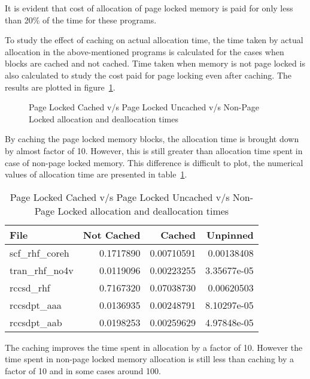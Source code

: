 It is evident that cost of allocation of page locked memory is
paid for only less than 20\% of the time for these programs.

To study the effect of caching on actual allocation time, the time taken by actual
allocation in the above-mentioned programs is calculated for the cases when blocks
are cached and not cached. Time taken when memory is not page locked is
also calculated to study the cost paid for page locking even after caching.
The results are plotted in figure~\ref{fig:mempin_caching}.

\begin{figure}[h]
  
  \caption{Page Locked Cached v/s Page Locked Uncached v/s Non-Page Locked allocation
  and deallocation times}
  \label{fig:mempin_caching}
\end{figure}

By caching the page locked memory blocks, the allocation time is brought down by
almost factor of 10. However, this is still greater than allocation time spent in
case of non-page locked memory. This difference is difficult to plot, the numerical
values of allocation time are presented in table~\ref{tab:mempin_caching}.

\begin{table}[h]
  \centering
  \caption{Page Locked Cached v/s Page Locked Uncached v/s Non-Page Locked allocation
  and deallocation times}
  \begin{tabular}{l r r r}
    \hline
    File            & Not Cached & Cached     & Unpinned    \\
    \hline
    scf\_rhf\_coreh & 0.1717890  & 0.00710591 & 0.00138408  \\
    tran\_rhf\_no4v & 0.0119096  & 0.00223255 & 3.35677e-05 \\
    rccsd\_rhf      & 0.7167320  & 0.07038730 & 0.00620503  \\
    rccsdpt\_aaa    & 0.0136935  & 0.00248791 & 8.10297e-05 \\
    rccsdpt\_aab    & 0.0198253  & 0.00259629 & 4.97848e-05 \\
    \hline
  \end{tabular}
  \label{tab:mempin_caching}
\end{table}

The caching improves the time spent in allocation by a factor of 10. However the time
spent in non-page locked memory allocation is still less than caching by a factor
of 10 and in some cases around 100.
